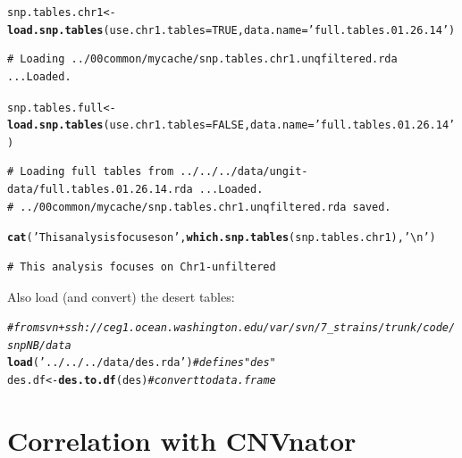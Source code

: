 \documentclass{article}\usepackage[]{graphicx}\usepackage[]{color}
\makeatletter
\newcommand{\hlnum}[1]{\textcolor[rgb]{0.686,0.059,0.569}{#1}}%
\newcommand{\hlstr}[1]{\textcolor[rgb]{0.192,0.494,0.8}{#1}}%
\newcommand{\hlcom}[1]{\textcolor[rgb]{0.678,0.584,0.686}{\textit{#1}}}%
\newcommand{\hlstd}[1]{\textcolor[rgb]{0.345,0.345,0.345}{#1}}%
\newcommand{\hlkwb}[1]{\textcolor[rgb]{0.69,0.353,0.396}{#1}}%
\newcommand{\hlkwc}[1]{\textcolor[rgb]{0.333,0.667,0.333}{#1}}%
\newcommand{\hlkwd}[1]{\textcolor[rgb]{0.737,0.353,0.396}{\textbf{#1}}}%
\newenvironment{kframe}{%
 \def\at@end@of@kframe{}%
 \ifinner\ifhmode%
  \def\at@end@of@kframe{\end{minipage}}%
  \begin{minipage}{\columnwidth}%
 \fi\fi%
 \def\FrameCommand##1{\hskip\@totalleftmargin \hskip-\fboxsep
 \colorbox{shadecolor}{##1}\hskip-\fboxsep
     \hskip-\linewidth \hskip-\@totalleftmargin \hskip\columnwidth}%
 \MakeFramed {\advance\hsize-\width
   \@totalleftmargin\z@ \linewidth\hsize
   \@setminipage}}%
 {\par\unskip\endMakeFramed%
 \at@end@of@kframe}
\newenvironment{knitrout}{}{} %
\makeatother
\begin{document}
\begin{knitrout}\footnotesize
{}\color{fgcolor}\begin{kframe}
\begin{alltt}
\hlstd{snp.tables.chr1} \hlkwb{<-} \hlkwd{load.snp.tables}\hlstd{(}\hlkwc{use.chr1.tables}\hlstd{=}\hlnum{TRUE}\hlstd{,}  \hlkwc{data.name} \hlstd{=} \hlstr{'full.tables.01.26.14'}\hlstd{)}
\end{alltt}
\begin{verbatim}
# Loading ../00common/mycache/snp.tables.chr1.unqfiltered.rda ...Loaded.
\end{verbatim}
\begin{alltt}
\hlstd{snp.tables.full} \hlkwb{<-} \hlkwd{load.snp.tables}\hlstd{(}\hlkwc{use.chr1.tables}\hlstd{=}\hlnum{FALSE}\hlstd{,} \hlkwc{data.name} \hlstd{=} \hlstr{'full.tables.01.26.14'}\hlstd{)}
\end{alltt}
\begin{verbatim}
# Loading full tables from ../../../data/ungit-data/full.tables.01.26.14.rda ...Loaded.
# ../00common/mycache/snp.tables.chr1.unqfiltered.rda saved.
\end{verbatim}
\begin{alltt}
\hlkwd{cat}\hlstd{(}\hlstr{'This analysis focuses on'}\hlstd{,} \hlkwd{which.snp.tables}\hlstd{(snp.tables.chr1),} \hlstr{'\textbackslash{}n'}\hlstd{)}
\end{alltt}
\begin{verbatim}
# This analysis focuses on Chr1-unfiltered
\end{verbatim}
\end{kframe}
\end{knitrout}

Also load (and convert) the desert tables:

\begin{knitrout}\footnotesize
{}\color{fgcolor}\begin{kframe}
\begin{alltt}
\hlcom{# from svn+ssh://ceg1.ocean.washington.edu/var/svn/7_strains/trunk/code/snpNB/data}
\hlkwd{load}\hlstd{(}\hlstr{'../../../data/des.rda'}\hlstd{)} \hlcom{# defines "des"}
\hlstd{des.df} \hlkwb{<-} \hlkwd{des.to.df}\hlstd{(des)}      \hlcom{# convert to data.frame}
\end{alltt}
\end{kframe}
\end{knitrout}

\section{Correlation with CNVnator}
\end{document}
